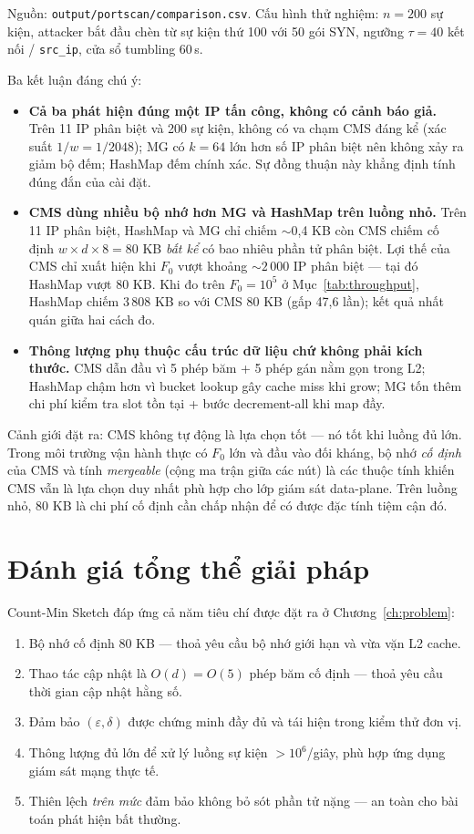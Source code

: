 \noindent Nguồn: \texttt{output/portscan/comparison.csv}. Cấu hình thử nghiệm: $n = 200$ sự kiện, attacker bắt đầu chèn từ sự kiện thứ 100 với 50 gói SYN, ngưỡng $\tau = 40$ kết nối / \texttt{src\_ip}, cửa sổ tumbling 60\,s.

Ba kết luận đáng chú ý:

\begin{itemize}
  \item \textbf{Cả ba phát hiện đúng một IP tấn công, không có cảnh báo giả.} Trên 11 IP phân biệt và 200 sự kiện, không có va chạm CMS đáng kể (xác suất $1/w = 1/2048$); MG có $k = 64$ lớn hơn số IP phân biệt nên không xảy ra giảm bộ đếm; HashMap đếm chính xác. Sự đồng thuận này khẳng định tính đúng đắn của cài đặt.
  \item \textbf{CMS dùng nhiều bộ nhớ hơn MG và HashMap trên luồng nhỏ.} Trên 11 IP phân biệt, HashMap và MG chỉ chiếm $\sim$0{,}4 KB còn CMS chiếm cố định $w \times d \times 8 = 80$ KB \textit{bất kể} có bao nhiêu phần tử phân biệt. Lợi thế của CMS chỉ xuất hiện khi $F_0$ vượt khoảng $\sim 2\,000$ IP phân biệt --- tại đó HashMap vượt 80 KB. Khi đo trên $F_0 = 10^5$ ở Mục~\ref{tab:throughput}, HashMap chiếm 3\,808 KB so với CMS 80 KB (gấp 47{,}6 lần); kết quả nhất quán giữa hai cách đo.
  \item \textbf{Thông lượng phụ thuộc cấu trúc dữ liệu chứ không phải kích thước.} CMS dẫn đầu vì 5 phép băm + 5 phép gán nằm gọn trong L2; HashMap chậm hơn vì bucket lookup gây cache miss khi grow; MG tốn thêm chi phí kiểm tra slot tồn tại + bước decrement-all khi map đầy.
\end{itemize}

Cảnh giới đặt ra: CMS không tự động là lựa chọn tốt --- nó tốt khi luồng đủ lớn. Trong môi trường vận hành thực có $F_0$ lớn và đầu vào đối kháng, bộ nhớ \textit{cố định} của CMS và tính \textit{mergeable} (cộng ma trận giữa các nút) là các thuộc tính khiến CMS vẫn là lựa chọn duy nhất phù hợp cho lớp giám sát data-plane. Trên luồng nhỏ, 80 KB là chi phí cố định cần chấp nhận để có được đặc tính tiệm cận đó.

\section{Đánh giá tổng thể giải pháp}

Count-Min Sketch đáp ứng cả năm tiêu chí được đặt ra ở Chương~\ref{ch:problem}:

\begin{enumerate}
  \item Bộ nhớ cố định 80 KB --- thoả yêu cầu bộ nhớ giới hạn và vừa vặn L2 cache.
  \item Thao tác cập nhật là $O(d) = O(5)$ phép băm cố định --- thoả yêu cầu thời gian cập nhật hằng số.
  \item Đảm bảo $(\varepsilon, \delta)$ được chứng minh đầy đủ và tái hiện trong kiểm thử đơn vị.
  \item Thông lượng đủ lớn để xử lý luồng sự kiện $> 10^6$/giây, phù hợp ứng dụng giám sát mạng thực tế.
  \item Thiên lệch \textit{trên mức} đảm bảo không bỏ sót phần tử nặng --- an toàn cho bài toán phát hiện bất thường.
\end{enumerate}

